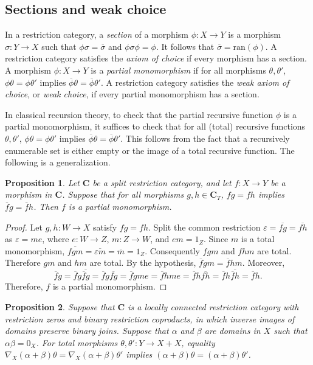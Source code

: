 \documentclass[letterpaper,10pt]{amsart}
\theoremstyle{plain}
\newtheorem{prop}{Proposition}[thm]
\theoremstyle{definition}
\newcommand{\MAP}[3]{{#1}:{#2}\rightarrow{#3}}
\newcommand{\rst}[1]{\overline{#1}}
\begin{document}
\subsection{Sections and weak choice}
In a restriction category, a {\it section} of a morphism
$\MAP{\phi}{X}{Y}$  is a morphism $\MAP{\sigma}{Y}{X}$ such that
$\phi\sigma=\rst\sigma$ and $\phi\sigma\phi=\phi$. It follows that
$\rst{\sigma}=\mathrm{ran}(\phi)$. A
restriction category satisfies the {\it axiom of choice} if every morphism
has a section. A morphism  $\MAP{\phi}{X}{Y}$ is a {\it partial monomorphism}
if for all morphisms $\theta,\theta'$, $\phi\theta=\phi\theta'$ implies $\rst{\phi}\theta=\rst{\phi}\theta'$.
A restriction category satisfies the \textit{weak axiom of choice},
or \textit{weak choice}, if every partial monomorphism has a section.

In classical recursion theory, to check that the partial recursive function $\phi$ is a partial monomorphism, it suffices to check that for all (total) recursive functions $\theta,\theta'$, $\phi\theta=\phi\theta'$ implies $\rst\phi\theta=\rst\phi\theta'$. This follows from the fact that a recursively enumerable set is either empty or the image of a total recursive function. The following is a generalization.

\begin{prop}\label{PropPartialMono}
Let $\mathbf{C}$ be a split restriction category, and let $\MAP{f}{X}{Y}$ be a morphism in $\mathbf{C}$. Suppose that for all morphisms $g,h\in\mathbf{C}_T$, $f g=f h$ implies $\rst{f} g=\rst{f}h$. 
Then $f$ is a partial monomorphism.
\end{prop}

\begin{proof}
Let $g,h:W\to X$ satisfy $fg=fh$. Split the common restriction
$\varepsilon=\rst{fg}=\rst{fh}$ as $\varepsilon=me$, where
$e:W\to Z$, $m:Z\to W$, and $em=1_Z$. Since $m$ is a total monomorphism,
$\rst{fgm}=\rst{\varepsilon m}=\rst m=1_Z$.
Consequently $fgm$ and $fhm$ are total. 
Therefore
$g m$ and $h m$ are total. By the hypothesis, $\rst{f}g m = \rst{f}h m$. Moreover,
\[
\rst{f}g = \rst{f}g\rst{\rst{f}g} = \rst{f}g\rst{fg}
         = \rst{f}gme =\rst{f}hme =\rst{f}h\rst{fh}
         =\rst{f}h\rst{\rst{f}h} = \rst{f}h.
\]
Therefore, $f$ is a partial monomorphism.
\end{proof}

\begin{prop}
Suppose that $\mathbf C$ is a locally connected restriction category
with restriction zeros and binary restriction coproducts, in which
inverse images of domains preserve binary joins. 
Suppose that $\alpha$ and $\beta$ are domains in $X$ such that $\alpha\beta=0_X$.
For total morphisms $\theta,\theta':Y\to X+X$, equality
$\nabla_X(\alpha+\beta)\theta=\nabla_X(\alpha+\beta)\theta'$
implies $(\alpha+\beta)\theta=(\alpha+\beta)\theta'$.
\end{prop}
\end{document}
